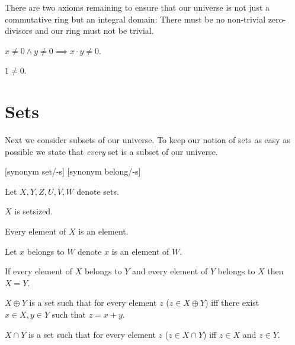 \documentclass{article}
\begin{document}
  There are two axioms remaining to ensure that our universe is not just a commutative ring but an integral domain: There must be no non-trivial zero-divisors and our ring must not be trivial.

  \begin{forthel}
    \begin{axiom}[Cancel]
      $x \neq 0 \wedge y \neq 0 \implies x \cdot y \neq 0$.
    \end{axiom}

    \begin{axiom}[UnNeZr]
      $1 \neq 0$.
    \end{axiom}
  \end{forthel}


  \section{Sets}

  Next we consider subsets of our universe. To keep our notion of sets as easy as possible we state that \textit{every} set is a subset of our universe.

  \begin{forthel}

    [synonym set/-s] [synonym belong/-s]

    Let $X,Y,Z,U,V,W$ denote sets.

    \begin{axiom}
      $X$ is setsized.
    \end{axiom}

    \begin{axiom}
      Every element of $X$ is an element.
    \end{axiom}

    Let $x$ belongs to $W$ denote $x$ is an element of $W$.

    \begin{axiom}[SetEq]
      If every element of $X$ belongs to $Y$ and every element of $Y$ belongs to $X$ then $X = Y$.
    \end{axiom}

    \begin{definition}[DefSum]
      $X \oplus Y$ is a set such that for every element $z$ ($z \in X \oplus Y$) iff there exist $x \in X, y \in Y$ such that $z = x + y$.
    \end{definition}

    \begin{definition}[DefSInt]
      $X \cap Y$ is a set such that for every element $z$ ($z \in X \cap Y$) iff $z \in X$ and $z \in Y$.
    \end{definition}
  \end{forthel}
\end{document}
